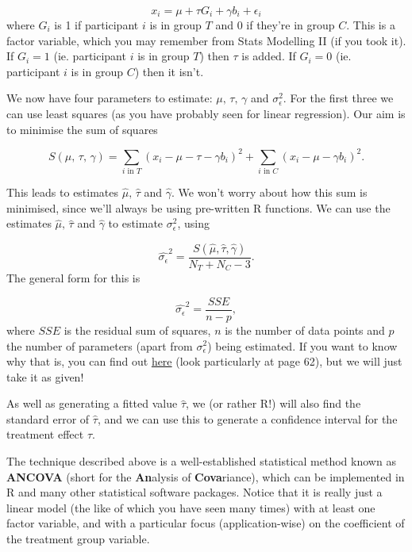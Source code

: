 \documentclass[
  openany]{book}
\theoremstyle{definition}
\theoremstyle{definition}
\theoremstyle{definition}
\theoremstyle{definition}
\theoremstyle{remark}
\begin{document}
\[ x_i = \mu + \tau G_i+ \gamma b_i + \epsilon_i \]
where \(G_i\) is 1 if participant \(i\) is in group \(T\) and 0 if they're in group \(C\). This is a factor variable, which you may remember from Stats Modelling II (if you took it). If \(G_i=1\) (ie. participant \(i\) is in group \(T\)) then \(\tau\) is added. If \(G_i=0\) (ie. participant \(i\) is in group \(C\)) then it isn't.

We now have four parameters to estimate: \(\mu,\,\tau,\,\gamma\) and \(\sigma^2_\epsilon\). For the first three we can use least squares (as you have probably seen for linear regression). Our aim is to minimise the sum of squares

\[S\left(\mu,\, \tau,\,\gamma\right) = \sum\limits_{i\text{ in }T} \left(x_i - \mu - \tau - \gamma b_i\right)^2 + \sum\limits_{i\text{ in }C} \left(x_i - \mu - \gamma b_i\right)^2.\]

This leads to estimates \(\hat{\mu},\, \hat{\tau}\) and \(\hat{\gamma}\). We won't worry about how this sum is minimised, since we'll always be using pre-written R functions. We can use the estimates \(\hat{\mu},\, \hat{\tau}\) and \(\hat{\gamma}\) to estimate \(\sigma^2_\epsilon\), using

\[\hat{\sigma_\epsilon}^2 = \frac{S\left(\hat{\mu},\hat{\tau}, \hat{\gamma}\right)}{N_T + N_C -3}.\]
The general form for this is

\[ \hat{\sigma_\epsilon}^2 = \frac{SSE}{n-p},\]
where \(SSE\) is the residual sum of squares, \(n\) is the number of data points and \(p\) the number of parameters (apart from \(\sigma_\epsilon^2\)) being estimated. If you want to know why that is, you can find out \href{https://pages.stern.nyu.edu/~wgreene/MathStat/GreeneChapter4.pdf}{here} (look particularly at page 62), but we will just take it as given!

As well as generating a fitted value \(\hat{\tau}\), we (or rather R!) will also find the standard error of \(\hat\tau\), and we can use this to generate a confidence interval for the treatment effect \(\tau\).

The technique described above is a well-established statistical method known as \textbf{ANCOVA} (short for the \textbf{An}alysis of \textbf{Cova}riance), which can be implemented in R and many other statistical software packages. Notice that it is really just a linear model (the like of which you have seen many times) with at least one factor variable, and with a particular focus (application-wise) on the coefficient of the treatment group variable.
\end{document}
